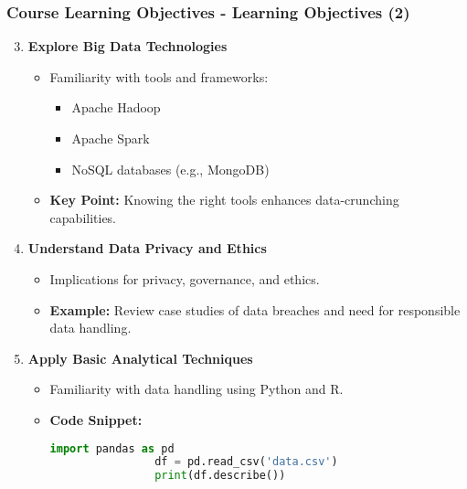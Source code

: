 \documentclass[aspectratio=169]{beamer}
\begin{document}
\begin{frame}[fragile]
    \frametitle{Course Learning Objectives - Learning Objectives (2)}
    \begin{enumerate}
        \setcounter{enumi}{2}
        \item \textbf{Explore Big Data Technologies}
            \begin{itemize}
                \item Familiarity with tools and frameworks:
                    \begin{itemize}
                        \item Apache Hadoop
                        \item Apache Spark
                        \item NoSQL databases (e.g., MongoDB)
                    \end{itemize}
                \item \textbf{Key Point:} Knowing the right tools enhances data-crunching capabilities.
            \end{itemize}
        
        \item \textbf{Understand Data Privacy and Ethics}
            \begin{itemize}
                \item Implications for privacy, governance, and ethics.
                \item \textbf{Example:} Review case studies of data breaches and need for responsible data handling.
            \end{itemize}
        
        \item \textbf{Apply Basic Analytical Techniques}
            \begin{itemize}
                \item Familiarity with data handling using Python and R.
                \item \textbf{Code Snippet:}
                \begin{lstlisting}[language=Python]
                import pandas as pd
                df = pd.read_csv('data.csv')
                print(df.describe())
                \end{lstlisting}
            \end{itemize}
    \end{enumerate}
\end{frame}
\end{document}
